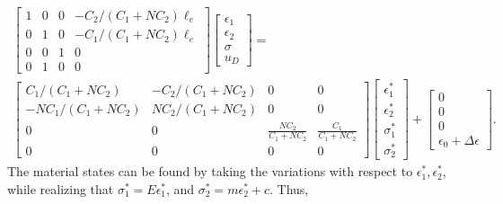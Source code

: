 \documentclass[11pt]{elsarticle}
\begin{document}
\begin{multline}
	\begin{bmatrix}
		1 & 0& 0&  -C_2/(C_1+NC_2) \ell_e \\
		0 & 1 & 0 & -C_1/(C_1+NC_2) \ell_e \\
		0 & 0 & 1 & 0 \\
		0 & 1 & 0 & 0
	\end{bmatrix}
	\begin{bmatrix}
		\epsilon_1 \\
		\epsilon_2 \\
		\sigma \\
		u_D
	\end{bmatrix}
	= \\
	\begin{bmatrix}
		C_1/(C_1+NC_2) & -C_2/(C_1+NC_2) & 0 & 0 \\
		-NC_1/(C_1+NC_2) & NC_2/(C_1+NC_2) & 0 & 0 \\
		0 & 0 & \frac{NC_2}{C_1+N C_2} & \frac{C_1}{C_1+N C_2} \\ 
		0 & 0 & 0&0
	\end{bmatrix}
	\begin{bmatrix}
		\epsilon_1^* \\
		\epsilon_2^* \\
		\sigma_1^* \\
		\sigma_2^* 
	\end{bmatrix}
	+
	\begin{bmatrix}
		0 \\
		0  \\
		0	\\
		\epsilon_0 + \Delta \epsilon
	\end{bmatrix}
	.
\end{multline}
The material states can be found by taking the variations with respect to $\epsilon_1^*, \epsilon_2^*$, while realizing that $\sigma_1^*=E\epsilon_1^*$, and $\sigma_2^*=m\epsilon_2^*+c$. Thus,
\end{document}
